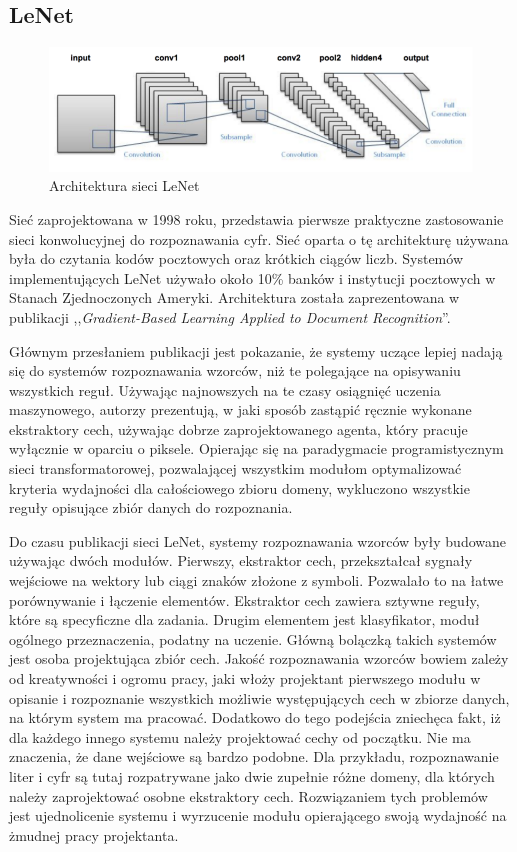 \documentclass[12pt,a4paper,twoside,titlepage,openright]{book}
\begin{document}
\begin{itemize}
\begin{itemize}
\section{LeNet}
\begin{figure}[ht]
	\centering
			\includegraphics[resolution=100, scale=0.6]{LeNet.png}
		\caption{Architektura sieci LeNet}
\end{figure}

Sieć zaprojektowana w 1998 roku, przedstawia pierwsze praktyczne zastosowanie sieci konwolucyjnej do rozpoznawania cyfr. Sieć oparta o tę architekturę używana była do czytania kodów pocztowych oraz krótkich ciągów liczb. Systemów implementujących LeNet używało około 10\% banków i instytucji pocztowych w Stanach Zjednoczonych Ameryki. Architektura została zaprezentowana w publikacji ,,\textit{Gradient-Based Learning Applied to Document Recognition}''.

Głównym przesłaniem publikacji jest pokazanie, że systemy uczące lepiej nadają się do systemów rozpoznawania wzorców, niż te polegające na opisywaniu wszystkich reguł. Używając najnowszych na te czasy osiągnięć uczenia maszynowego, autorzy prezentują, w jaki sposób zastąpić ręcznie wykonane ekstraktory cech, używając dobrze zaprojektowanego agenta, który pracuje wyłącznie w oparciu o piksele. Opierając się na paradygmacie programistycznym sieci transformatorowej, pozwalającej wszystkim modułom optymalizować kryteria wydajności dla całościowego zbioru domeny, wykluczono wszystkie reguły opisujące zbiór danych do rozpoznania.

Do czasu publikacji sieci LeNet, systemy rozpoznawania wzorców były budowane używając dwóch modułów. Pierwszy, ekstraktor cech, przekształcał sygnały wejściowe na wektory lub ciągi znaków złożone z symboli. Pozwalało to na łatwe porównywanie i łączenie elementów. Ekstraktor cech zawiera sztywne reguły, które są specyficzne dla zadania. Drugim elementem jest klasyfikator, moduł ogólnego przeznaczenia, podatny na uczenie. Główną bolączką takich systemów jest osoba projektująca zbiór cech. Jakość rozpoznawania wzorców bowiem zależy od kreatywności i ogromu pracy, jaki włoży projektant pierwszego modułu w opisanie i rozpoznanie wszystkich możliwie występujących cech w zbiorze danych, na którym system ma pracować. Dodatkowo do tego podejścia zniechęca fakt, iż dla każdego innego systemu należy projektować cechy od początku. Nie ma znaczenia, że dane wejściowe są bardzo podobne. Dla przykładu, rozpoznawanie liter i cyfr są tutaj rozpatrywane jako dwie zupełnie różne domeny, dla których należy zaprojektować osobne ekstraktory cech. Rozwiązaniem tych problemów jest ujednolicenie systemu i wyrzucenie modułu opierającego swoją wydajność na żmudnej pracy projektanta.


\end{itemize}
\end{itemize}
\end{document}
